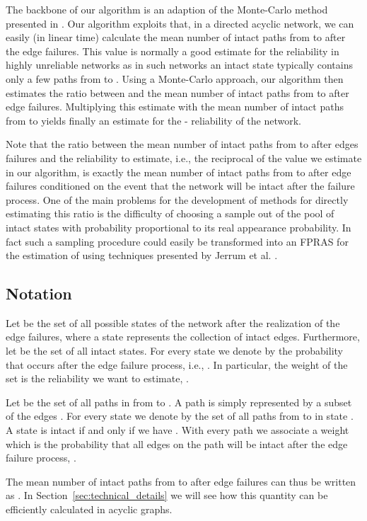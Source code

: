 \documentclass{article}
\begin{document}
The backbone of our algorithm is an
adaption of the \mbox{Monte-Carlo} method presented in
\cite{karp_1985_montecarlo}.
Our algorithm exploits that, in a directed acyclic network,
we can easily (in linear time) calculate
the mean number of intact paths from  to  after the edge failures.
This value is normally a good estimate for the reliability
in highly unreliable networks as in such networks an intact
state typically contains only
a few paths from  to . Using a \mbox{Monte-Carlo} approach,
our algorithm then estimates the ratio between
 and the mean number of intact paths from  to  after edge
failures. Multiplying this estimate
with the mean number of intact paths from  to  yields
finally an estimate for the - reliability of the network.

Note that the ratio between the mean number of intact paths from  to  after
edges failures and the reliability to estimate, i.e., the reciprocal of the value we
estimate in our algorithm, is exactly the mean number of
intact paths from  to  after edge failures conditioned on the event that
the network will be intact after the failure process. One of the main problems for
the development of methods for directly estimating this ratio is the difficulty
of choosing a sample out of the pool of intact states with probability proportional to
its real appearance probability. In fact such a sampling procedure could easily be
transformed into an FPRAS for the estimation of 
using techniques presented by Jerrum et al. \cite{jerrum_1986_random}.


\subsection{Notation}
Let  be the set of all
possible states of the network  after the realization of the edge failures,
where a state  represents the collection of intact
edges.
Furthermore, let  be the set of all intact states.
For every state 
we denote by  the probability that  occurs after
the edge failure process, i.e., \;.
In particular, the weight of the set  is the reliability
we want to estimate, .

Let  be the set of all paths in
 from  to . A path  is simply represented
by a subset of the edges . For every state  we
denote by  the set
of all paths from  to  in state . A state 
is intact if and only if we have
.
With every path 
we associate a weight  which is the probability
that all edges on the path will be intact after the edge
failure process, \;.

The mean number of intact paths from  to 
after edge failures can thus be
written as . In
Section~\ref{sec:technical_details} we will see how this quantity
can be efficiently calculated in acyclic graphs.
\end{document}
